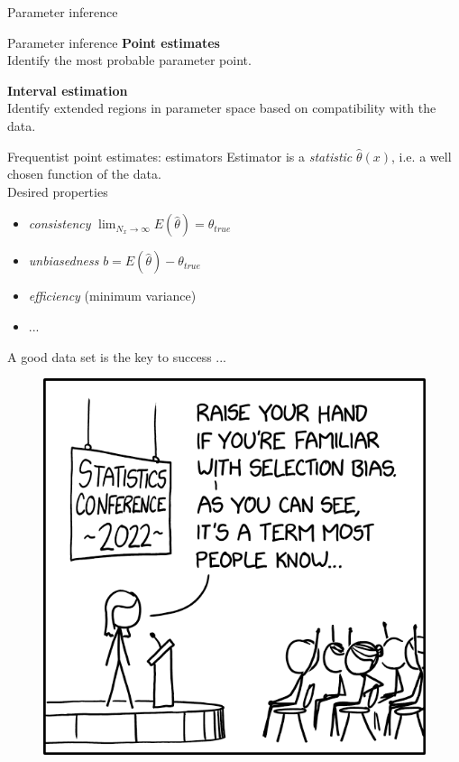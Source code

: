 \documentclass[
aspectratio=169,
14pt,
professionalfonts
]{beamer}
\begin{document}
\begin{frame}
\center
\Large
Parameter inference
\end{frame}

\begin{frame}{Parameter inference}
    \center
    \textbf{Point estimates}\\
    Identify the most probable parameter point.

    \vspace{1cm}

    \textbf{Interval estimation}\\
    Identify extended regions in parameter space based on compatibility with the data.
\end{frame}

\begin{frame}{Frequentist point estimates: estimators}
    Estimator is a \textit{statistic} $\hat \theta(x)$, i.e. a well chosen function of the data. \\
    Desired properties
    \begin{itemize}
        \item \textit{consistency} $\lim_{N_x \to \infty} E(\hat \theta) = \theta_{true}$
        \item \textit{unbiasedness} $b = E(\hat \theta) - \theta_{true}$
        \item \textit{efficiency} (minimum variance)
        \item ...
    \end{itemize}
\end{frame}

\begin{frame}{A good data set is the key to success ...}
\begin{figure}
    \centering
    \includegraphics[width=0.4\linewidth]{../plots/selection_bias_2x.png}
\end{figure}
\end{frame}
\end{document}
